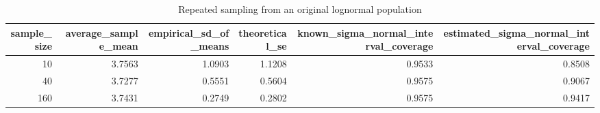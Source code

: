 \begin{table}[htbp]
\centering
\caption{Repeated sampling from an original lognormal population}
\begingroup
\small
\setlength{\tabcolsep}{6pt}
\renewcommand{\arraystretch}{1.12}
\begin{adjustbox}{max width=\linewidth}
\begin{tabular}{@{}rrrrrr@{}}
\toprule
sample\_size & average\_sample\_mean & empirical\_sd\_of\_means & theoretical\_se & known\_sigma\_normal\_interval\_coverage & estimated\_sigma\_normal\_interval\_coverage \\
\midrule
10 & 3.7563 & 1.0903 & 1.1208 & 0.9533 & 0.8508 \\
40 & 3.7277 & 0.5551 & 0.5604 & 0.9575 & 0.9067 \\
160 & 3.7431 & 0.2749 & 0.2802 & 0.9575 & 0.9417 \\
\bottomrule
\end{tabular}
\end{adjustbox}
\endgroup
\end{table}